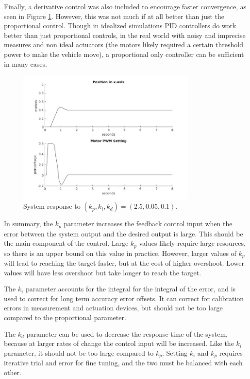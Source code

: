 \documentclass{journal}
\begin{document}
Finally, a derivative control was also included to encourage faster convergence, as seen in Figure \ref{fig:Lab1_p2_5i0_05d0_1}.  However, this was not much if at all better than just the proportional control.  Though in idealized simulations PID controllers do work better than just proportional controls, in the real world with noisy and imprecise measures and non ideal actuators (the motors likely required a certain threshold power to make the vehicle move), a proportional only controller can be sufficient in many cases.

\begin{figure}[H]
	\centering
	\includegraphics[width = 0.8\textwidth]{NickPhamgraphs/p2_5i0_05d0_1.jpg}
	\caption{System response to $(k_p, k_i, k_d) = (2.5, 0.05, 0.1)$.}
	\label{fig:Lab1_p2_5i0_05d0_1}
\end{figure}

In summary, the $k_p$ parameter increases the feedback control input when the error between the system output and the desired output is large.  This should be the main component of the control.  Large $k_p$ values likely require large resources, so there is an upper bound on this value in practice.  However, larger values of $k_p$ will lead to reaching the target faster, but at the cost of higher overshoot.  Lower values will have less overshoot but take longer to reach the target.

The $k_i$ parameter accounts for the integral for the integral of the error, and is used to correct for long term accuracy error offsets.  It can correct for calibration errors in measurement and actuation devices, but should not be too large compared to the proportional parameter.

The $k_d$ parameter can be used to decrease the response time of the system, because at larger rates of change the control input will be increased.  Like the $k_i$ parameter, it should not be too large compared to $k_p$.  Setting $k_i$ and $k_p$ requires iterative trial and error for fine tuning, and the two must be balanced with each other.


\end{document}
